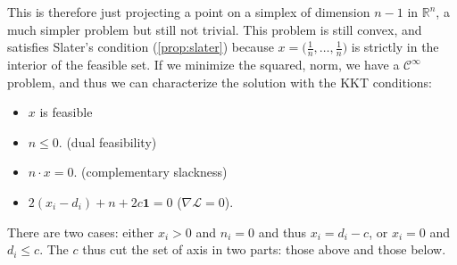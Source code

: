 \documentclass[10pt]{report}
\theoremstyle{plain}
\newtheorem{prop}[thm]{Property}
\theoremstyle{definition}
\theoremstyle{remark}
\newcommand{\R}{\ensuremath{\mathbb{R}}}
\renewcommand{\leq}{\leqslant}
\DeclareMathOperator{\Span}{Span}
\newcommand{\class}[1]{{\mathscr{C}^{#1}}}
\begin{document}
This is therefore just projecting a point on a simplex of dimension $n-1$ in
$\R^n$, a much simpler problem but still not trivial. This problem is still
convex, and satisfies Slater's condition (\ref{prop:slater}) because $x = \big(\frac1n,\ldots,\frac1n\big)$
is strictly in the interior of the feasible set. If we minimize the squared,
norm, we have a $\class \infty$ problem, and thus we can characterize the
solution with the KKT conditions:
\begin{itemize}
\item $x$ is feasible
\item $n \leq 0$. (dual feasibility)
\item $n \cdot x = 0$. (complementary slackness)
\item $\displaystyle 2(x_i-d_i) + n + 2c \mathbf 1 = 0$ ($\nabla \mathcal{L} = 0$).
\end{itemize}

There are two cases: either $x_i > 0$ and $n_i = 0$ and thus $x_i = d_i - c$, or
$x_i = 0$ and $d_i \leq c$. The $c$ thus cut the set of axis in two parts: those above
and those below.









\end{document}
